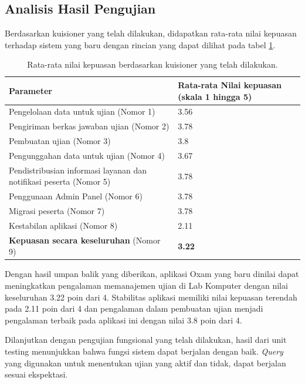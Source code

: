 \subsection{Analisis Hasil Pengujian}
    Berdasarkan
    kuisioner yang telah dilakukan, didapatkan rata-rata nilai kepuasan terhadap sistem yang baru dengan
    rincian yang dapat dilihat pada tabel \ref{tab:survey-avg}.
    \begin{table}[h]
        \centering
        \caption{Rata-rata nilai kepuasan berdasarkan kuisioner yang telah dilakukan.}
        \label{tab:survey-avg}
        \begin{tabularx}{\textwidth}{|X|X|}
            \hline
             Parameter & Rata-rata Nilai kepuasan (skala 1 hingga 5)  \\
            \hline
             Pengelolaan data untuk ujian (Nomor 1) &  3.56 \\
            \hline
             Pengiriman berkas jawaban ujian (Nomor 2) &  3.78\\
            \hline
             Pembuatan ujian (Nomor 3) &  3.8 \\
            \hline
             Pengunggahan data untuk ujian (Nomor 4) &  3.67 \\
            \hline
             Pendistribusian informasi layanan dan notifikasi peserta (Nomor 5) &  3.78 \\
            \hline
             Penggunaan Admin Panel (Nomor 6) &  3.78 \\
            \hline
             Migrasi peserta (Nomor 7) &  3.78 \\
            \hline
             Kestabilan aplikasi (Nomor 8) &  2.11 \\
            \hline
             \textbf{Kepuasan secara keseluruhan} (Nomor 9) &  \textbf{3.22} \\
            \hline
        \end{tabularx}
    \end{table}
    
    Dengan hasil umpan balik yang diberikan, aplikasi Oxam yang baru dinilai dapat meningkatkan
    pengalaman memanajemen ujian di Lab Komputer dengan nilai keseluruhan 3.22 poin dari 4. Stabilitas
    aplikasi memiliki nilai kepuasan terendah pada 2.11 poin dari 4 dan pengalaman
    dalam pembuatan ujian menjadi pengalaman terbaik pada aplikasi ini dengan nilai 3.8 poin dari 4.
    
    Dilanjutkan dengan pengujian fungsional yang telah dilakukan, hasil dari unit testing menunjukkan
    bahwa fungsi sistem dapat berjalan dengan baik. \textit{Query} yang digunakan untuk menentukan
    ujian yang aktif dan tidak, dapat berjalan sesuai ekspektasi.